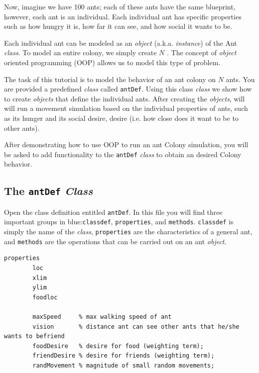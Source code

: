 \documentclass[12pt]{article}
\begin{document}
Now, imagine we have 100 ants; each of these ants have the same blueprint, however, each ant is an individual. Each individual ant has specific properties such as how hungry it is, how far it can see, and how social it wants to be. 

Each individual ant can be modeled as an \textit{object} (a.k.a. \textit{instance}) of the Ant \textit{class}. To model an entire colony, we simply create $N$ . The concept of \textit{object} oriented programming (OOP) allows us to model this type of problem.

The task of this tutorial is to model the behavior of an ant colony on $N$ ants. You are provided a predefined \textit{class} called \lstinline|antDef|. Using this class \textit{class} we show how to create \textit{objects} that define the individual ants. After creating the \textit{objects}, will will run a movement simulation based on the individual properties of ants, such as its hunger and its social desire, desire (i.e. how close does it want to be to other ants).

After demonstrating how to use OOP to run an ant Colony simulation, you will be asked to add functionality to the \lstinline|antDef| \textit{class} to obtain an desired Colony behavior. 

\subsection{The \lstinline|antDef| \textit{Class}} 

Open the class definition entitled \lstinline|antDef|. In this file you will find three important groups in blue:\lstinline|classdef|, \lstinline|properties|, and \lstinline|methods|. \lstinline|classdef| is simply the name of the \textit{class}, \lstinline|properties| are the characteristics of a general ant, and  \lstinline|methods| are the operations that can be carried out on an ant  \textit{object}.

\begin{lstlisting}[frame=single]
 properties
        loc
        xlim
        ylim
        foodloc
        
        maxSpeed     % max walking speed of ant
        vision       % distance ant can see other ants that he/she wants to befriend
        foodDesire   % desire for food (weighting term);
        friendDesire % desire for friends (weighting term);
        randMovement % magnitude of small random movements;
\end{lstlisting}
\end{document}
